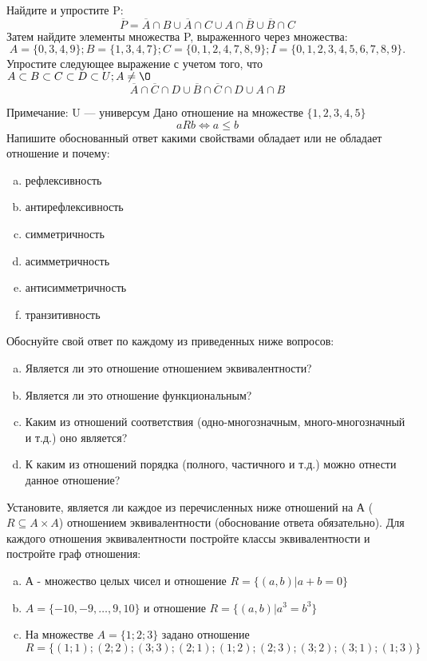 \documentclass[10pt]{exam}
\begin{document}
\begin{questions}
\question
Найдите и упростите P:
\begin{equation*}
\overline{P} = \overline{A} \cap B \cup \overline{A} \cap C \cup A \cap \overline{B} \cup \overline{B} \cap C
\end{equation*}
Затем найдите элементы множества P, выраженного через множества:
\begin{equation*}
A = \{0, 3, 4, 9\}; 
B = \{1, 3, 4, 7\};
C = \{0, 1, 2, 4, 7, 8, 9\};
I = \{0, 1, 2, 3, 4, 5, 6, 7, 8, 9\}.
\end{equation*}\question
Упростите следующее выражение с учетом того, что $A\subset B \subset C \subset D \subset U; A \neq \O$
\begin{equation*}
\overline{A} \cap \overline{C} \cap D \cup \overline{B} \cap \overline{C} \cap D \cup A \cap B
\end{equation*}

Примечание: U — универсум\question
Дано отношение на множестве $\{1, 2, 3, 4, 5\}$ 
\begin{equation*}
aRb \iff a \leq b
\end{equation*}
Напишите обоснованный ответ какими свойствами обладает или не обладает отношение и почему:   
\begin{enumerate} [a)]\setcounter{enumi}{0}
\item рефлексивность
\item антирефлексивность
\item симметричность
\item асимметричность
\item антисимметричность
\item транзитивность
\end{enumerate}

Обоснуйте свой ответ по каждому из приведенных ниже вопросов:
\begin{enumerate} [a)]\setcounter{enumi}{0}
    \item Является ли это отношение отношением эквивалентности?
    \item Является ли это отношение функциональным?
    \item Каким из отношений соответствия (одно-многозначным, много-многозначный и т.д.) оно является?
    \item К каким из отношений порядка (полного, частичного и т.д.) можно отнести данное отношение?
\end{enumerate}


\question
Установите, является ли каждое из перечисленных ниже отношений на А ($R \subseteq A \times A$) отношением эквивалентности (обоснование ответа обязательно). Для каждого отношения эквивалентности 
постройте классы эквивалентности и постройте граф отношения:
\begin{enumerate}[a)]\setcounter{enumi}{0}
\item А - множество целых чисел и отношение $R = \{(a,b)|a + b = 0\}$
\item $A = \{-10, -9, …, 9, 10\}$ и отношение $R = \{(a,b)|a^{3} = b^{3}\}$
\item На множестве $A = \{1; 2; 3\}$ задано отношение $R = \{(1; 1); (2; 2); (3; 3); (2; 1); (1; 2); (2; 3); (3; 2); (3; 1); (1; 3)\}$


\end{enumerate}
\end{questions}
\end{document}

